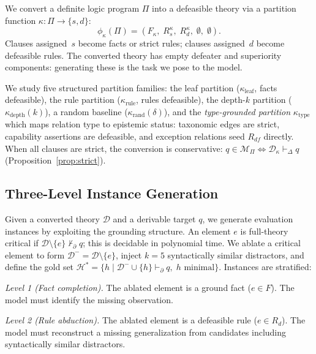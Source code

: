 \documentclass{article}
\theoremstyle{definition}
\newcommand{\D}{\mathcal{D}}
\newcommand{\Dm}{\mathcal{D}^{-}}
\newcommand{\Hgold}{\mathcal{H}^{*}}
\newcommand{\Rs}{R_s}
\newcommand{\Rd}{R_d}
\newcommand{\Rdf}{R_{df}}
\newcommand{\partfunc}{\kappa}
\newcommand{\pDelta}{\vdash_{\Delta}}
\newcommand{\pPartial}{\vdash_{\partial}}
\begin{document}
We convert a definite logic program $\Pi$ into a defeasible theory via a partition function $\partfunc: \Pi \to \{s, d\}$:
\begin{equation}\label{eq:conversion}
    \phi_\partfunc(\Pi) = (F_\partfunc,\; \Rs^{\partfunc},\; \Rd^{\partfunc},\; \emptyset,\; \emptyset).
\end{equation}
Clauses assigned~$s$ become facts or strict rules; clauses assigned~$d$ become defeasible rules. The converted theory has empty defeater and superiority components: generating these is the task we pose to the model.

We study five structured partition families: the leaf partition ($\partfunc_{\mathrm{leaf}}$, facts defeasible), the rule partition ($\partfunc_{\mathrm{rule}}$, rules defeasible), the depth-$k$ partition ($\partfunc_{\mathrm{depth}}(k)$), a random baseline ($\partfunc_{\mathrm{rand}}(\delta)$), and the \emph{type-grounded partition} $\partfunc_{\mathrm{type}}$ which maps relation type to epistemic status: taxonomic edges are strict, capability assertions are defeasible, and exception relations seed $\Rdf$ directly. When all clauses are strict, the conversion is conservative: $q \in \mathcal{M}_\Pi \iff \D_\partfunc \pDelta q$ (Proposition~\ref{prop:strict}).


\subsection{Three-Level Instance Generation}\label{subsec:instances}

Given a converted theory $\D$ and a derivable target $q$, we generate evaluation instances by exploiting the grounding structure. An element $e$ is full-theory critical if $\D \setminus \{e\} \not\pPartial q$; this is decidable in polynomial time. We ablate a critical element to form $\Dm = \D \setminus \{e\}$, inject $k = 5$ syntactically similar distractors, and define the gold set $\Hgold = \{h \mid \Dm \cup \{h\} \pPartial q,\; h \text{ minimal}\}$. Instances are stratified:

\textit{Level 1 (Fact completion).} The ablated element is a ground fact ($e \in F$). The model must identify the missing observation.

\textit{Level 2 (Rule abduction).} The ablated element is a defeasible rule ($e \in \Rd$). The model must reconstruct a missing generalization from candidates including syntactically similar distractors.
\end{document}
